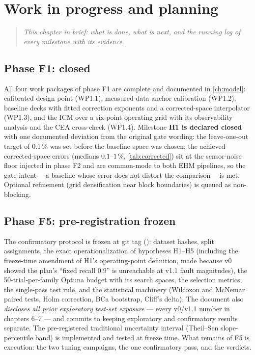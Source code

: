 \chapter{Work in progress and planning}
\label{ch:wip}

\begin{quote}\itshape
This chapter in brief: what is done, what is next, and the running log of every milestone with
its evidence.
\end{quote}

\section{Phase F1: closed}

All four work packages of phase F1 are complete and documented in \cref{ch:model}: calibrated
design point (WP1.1), measured-data anchor calibration (WP1.2), baseline decks with fitted
correction exponents and a corrected-space interpolator (WP1.3), and the ICM over a six-point
operating grid with its observability analysis and the CEA cross-check (WP1.4). Milestone
\textbf{H1 is declared closed} with one documented deviation from the original gate wording:
the leave-one-out target of $0.1\,\%$ was set before the baseline space was chosen; the
achieved corrected-space errors (medians $0.1$--$1\,\%$, \cref{tab:corrected}) sit at the
sensor-noise floor injected in phase F2 and are common-mode to both EHM pipelines, so the gate
intent ---a baseline whose error does not distort the comparison--- is met. Optional
refinement (grid densification near block boundaries) is queued as non-blocking.

\section{Phase F5: pre-registration frozen}

The confirmatory protocol is frozen at git tag 
(): dataset hashes, split assignments, the exact
operationalization of hypotheses H1--H5 (including the freeze-time amendment of H1's
operating-point definition, made because v0 showed the plan's ``fixed recall 0.9'' is
unreachable at v1.1 fault magnitudes), the 50-trial-per-family Optuna budget with its search
spaces, the selection metrics, the single-pass test rule, and the statistical machinery
(Wilcoxon and McNemar paired tests, Holm correction, BCa bootstrap, Cliff's delta). The
document also \emph{discloses all prior exploratory test-set exposure} --- every v0/v1.1
number in chapters 6--7 --- and commits to keeping exploratory and confirmatory results
separate. The pre-registered traditional uncertainty interval (Theil--Sen slope-percentile
band) is implemented and tested at freeze time. What remains of F5 is execution: the two
tuning campaigns, the one confirmatory pass, and the verdicts.

